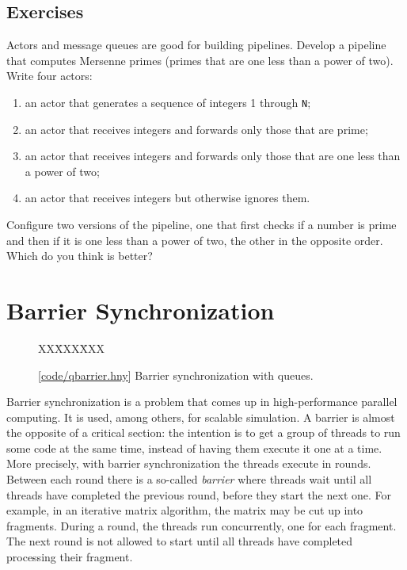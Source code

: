 \documentclass{report}
\newcommand{\harmonysource}[1]{
\begin{tabbing}
XX\=XXX\=XXX\kill
    
\end{tabbing}
}
\newcommand{\harmonylink}[1]{%
[\href{https://harmony.cs.cornell.edu/#1}{\underline{#1}}]%
}
\newenvironment{code}{
\tcolorbox
}{
\endtcolorbox
}
\begin{document}
\section*{Exercises}
\begin{problems}
\item Actors and message queues are good for building pipelines.
Develop a pipeline that computes Mersenne primes (primes that are one less
than a power of two).  Write four actors:
\begin{enumerate}
\item an actor that generates a sequence of integers 1 through \texttt{N};
\item an actor that receives integers and forwards only those that are prime;
\item an actor that receives integers and forwards only those that are one
less than a power of two;
\item an actor that receives integers but otherwise ignores them.
\end{enumerate}
Configure two versions of the pipeline, one that first checks if a number
is prime and then if it is one less than a power of two, the other
in the opposite order.  Which do you think is better?
\end{problems}

\chapter{Barrier Synchronization}
\label{ch:barrier}
%

%

\begin{figure}
\begin{code}
\harmonysource{qbarrier}
\end{code}
\caption{\harmonylink{code/qbarrier.hny} Barrier synchronization with queues.}
\label{fig:barrier}
\end{figure}

Barrier synchronization is a problem that comes up in high-performance
parallel computing.
It is used, among others, for scalable simulation.
A barrier is almost the opposite of a critical section:
the intention is to get a group of threads to run some code at the
same time, instead of having them execute it one at a time.
More precisely, with barrier synchronization the threads execute in rounds.
Between each round there is a so-called \emph{barrier} where threads wait
until all threads have completed the previous round, before they start the
next one.
For example, in an iterative matrix algorithm, the matrix may be
cut up into fragments.  During a round, the threads run concurrently,
one for each fragment.  The next round is not allowed to start
until all threads have completed processing their fragment.
\end{document}
